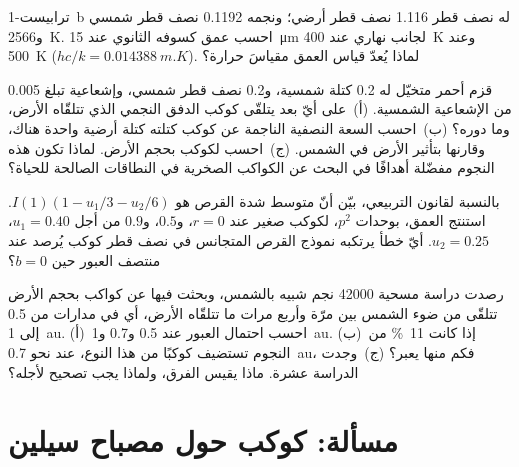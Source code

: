 \begin{exercise}[$\star\star$]\label{exo:b3:exoplanets:9}
ترابيست-1~b له نصف قطر 1.116 نصف قطر أرضي؛ ونجمه 0.1192 نصف قطر شمسي
و\qty{2566}{K}. احسب عمق كسوفه الثانوي عند
\qty{15}{\micro m} لجانب نهاري عند \qty{400}{K} وعند \qty{500}{K}
($hc/k = \qty{0.014388}{m.K}$). لماذا يُعدّ قياس العمق
مقياسَ حرارة؟
\end{exercise}

\begin{exercise}[$\star\star\star$]\label{exo:b3:exoplanets:10}
قزم أحمر متخيّل له 0.2 كتلة شمسية، و0.2 نصف قطر شمسي،
وإشعاعية تبلغ \num{0.005} من الإشعاعية الشمسية. (أ)~على أيّ بعد يتلقّى كوكب
الدفق النجمي الذي تتلقّاه الأرض، وما دوره؟
(ب)~احسب السعة النصفية الناجمة عن كوكب كتلته كتلة أرضية واحدة
هناك، وقارنها بتأثير الأرض في الشمس. (ج)~احسب
 لكوكب بحجم الأرض. لماذا تكون هذه النجوم مفضّلة
أهدافًا في البحث عن الكواكب الصخرية في النطاقات الصالحة للحياة؟
\end{exercise}

\begin{exercise}[$\star\star\star$]\label{exo:b3:exoplanets:11}
بالنسبة لقانون  التربيعي، بيّن أنّ متوسط شدة
القرص هو $I(1)(1 - u_1/3 - u_2/6)$. استنتج العمق، بوحدات
$p^2$، لكوكب صغير عند $r = 0$، و$0.5$، و$0.9$ من أجل $u_1 = 0.40$،
$u_2 = 0.25$. أيّ خطأ يرتكبه نموذج القرص المتجانس في نصف قطر
كوكب يُرصد عند منتصف العبور حين $b = 0$؟
\end{exercise}

\begin{exercise}[$\star\star\star$]\label{exo:b3:exoplanets:12}
رصدت دراسة مسحية \num{42000} نجم شبيه بالشمس، وبحثت فيها عن
كواكب بحجم الأرض تتلقّى من ضوء الشمس بين مرّة وأربع مرات ما تتلقّاه الأرض،
أي في مدارات من 0.5 إلى \qty{1}{au}. (أ)~احسب احتمال العبور
عند 0.5 و0.7 و\qty{1}{au}. (ب)~إذا كانت \qty{11}{\percent} من
النجوم تستضيف كوكبًا من هذا النوع، عند نحو \qty{0.7}{au}، فكم منها يعبر؟
(ج)~وجدت الدراسة عشرة. ماذا يقيس الفرق، ولماذا يجب
تصحيح  لأجله؟
\end{exercise}

\section{مسألة: كوكب حول مصباح سيلين}

